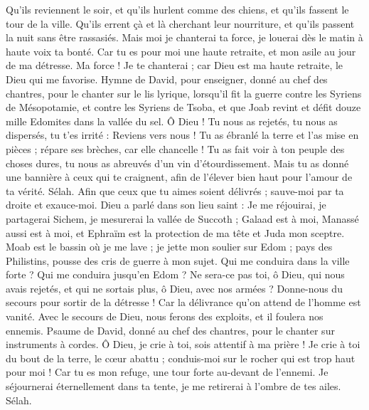 \begin{multicols}{2}
Qu'ils reviennent le soir, et qu'ils hurlent comme des chiens, et qu'ils fassent le tour de la ville.
Qu'ils errent çà et là cherchant leur nourriture, et qu'ils passent la nuit sans être rassasiés.
Mais moi je chanterai ta force, je louerai dès le matin à haute voix ta bonté. Car tu es pour moi une haute retraite, et mon asile au jour de ma détresse.
Ma force ! Je te chanterai ; car Dieu est ma haute retraite, le Dieu qui me favorise.
\VerseOne{}Hymne de David, pour enseigner, donné au chef des chantres, pour le chanter sur le lis lyrique,
lorsqu'il fit la guerre contre les Syriens de Mésopotamie, et contre les Syriens de Tsoba, et que Joab revint et défit douze mille Edomites dans la vallée du sel.
Ô Dieu ! Tu nous as rejetés, tu nous as dispersés, tu t'es irrité : Reviens vers nous !
Tu as ébranlé la terre et l'as mise en pièces ; répare ses brèches, car elle chancelle !
Tu as fait voir à ton peuple des choses dures, tu nous as abreuvés d'un vin d'étourdissement.
Mais tu as donné une bannière à ceux qui te craignent, afin de l'élever bien haut pour l'amour de ta vérité. Sélah.
Afin que ceux que tu aimes soient délivrés ; sauve-moi par ta droite et exauce-moi.
Dieu a parlé dans son lieu saint : Je me réjouirai, je partagerai Sichem, je mesurerai la vallée de Succoth ;
Galaad est à moi, Manassé aussi est à moi, et Ephraïm est la protection de ma tête et Juda mon sceptre.
Moab est le bassin où je me lave ; je jette mon soulier sur Edom ; pays des Philistins, pousse des cris de guerre à mon sujet.
Qui me conduira dans la ville forte ? Qui me conduira jusqu'en Edom ?
Ne sera-ce pas toi, ô Dieu, qui nous avais rejetés, et qui ne sortais plus, ô Dieu, avec nos armées ?
Donne-nous du secours pour sortir de la détresse ! Car la délivrance qu'on attend de l'homme est vanité.
Avec le secours de Dieu, nous ferons des exploits, et il foulera nos ennemis.
\VerseOne{}Psaume de David, donné au chef des chantres, pour le chanter sur instruments à cordes.
Ô Dieu, je crie à toi, sois attentif à ma prière !
Je crie à toi du bout de la terre, le cœur abattu ; conduis-moi sur le rocher qui est trop haut pour moi !
Car tu es mon refuge, une tour forte au-devant de l'ennemi.
Je séjournerai éternellement dans ta tente, je me retirerai à l'ombre de tes ailes. Sélah.

\end{multicols}

